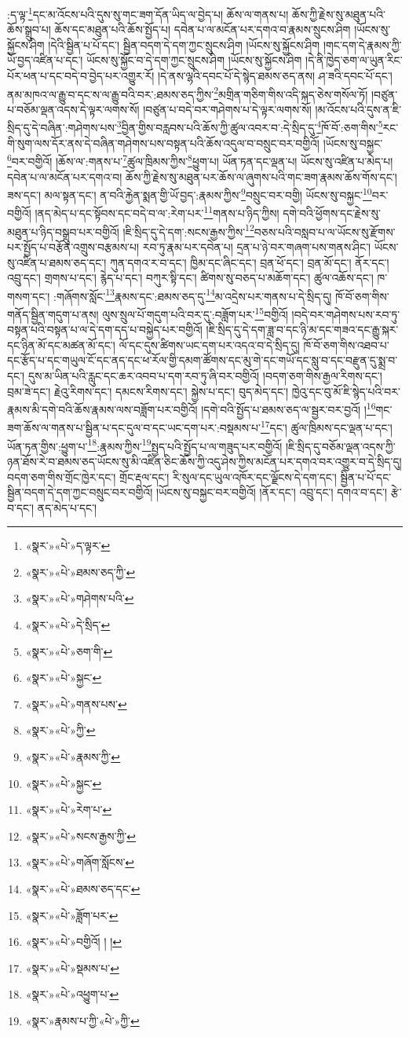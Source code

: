 :ད་ལྟ་\footnote{«སྣར་»«པེ་»ད་ལྟར་}དང་མ་འོངས་པའི་དུས་སུ་གང་ཟག་དོན་ཡིད་ལ་བྱེད་པ། ཆོས་ལ་གནས་པ། ཆོས་ཀྱི་རྗེས་སུ་མཐུན་པའི་ཆོས་སྒྲུབ་པ། ཆོས་དང་མཐུན་པའི་ཆོས་སྤྱོད་པ། དབེན་པ་ལ་མངོན་པར་དགའ་བ་རྣམས་སྲུངས་ཤིག །ཡོངས་སུ་སྐྱོངས་ཤིག །དེའི་སྦྱིན་པ་པོ་དང་། སྦྱིན་བདག་དེ་དག་ཀྱང་སྲུངས་ཤིག །ཡོངས་སུ་སྐྱོངས་ཤིག །གང་དག་དེ་རྣམས་ཀྱི་ཡོ་བྱད་འཛིན་པ་དང་། ཡོངས་སུ་སྐྱོང་བ་དེ་དག་ཀྱང་སྲུངས་ཤིག །ཡོངས་སུ་སྐྱོངས་ཤིག །དེ་ནི་ཁྱེད་ཅག་ལ་ཡུན་རིང་པོར་ཕན་པ་དང་བདེ་བ་བྱེད་པར་འགྱུར་རོ། །དེ་ནས་ལྷའི་དབང་པོ་དེ་སྙེད་ཐམས་ཅད་ནས། ཤ་ཟའི་དབང་པོ་དང་། ནམ་མཁའ་ལ་རྒྱུ་བ་དང་ས་ལ་རྒྱུ་བའི་བར་:ཐམས་ཅད་ཀྱིས་\footnote{«སྣར་»«པེ་»ཐམས་ཅད་ཀྱི་}མགྲིན་གཅིག་གིས་འདི་སྐད་ཅེས་གསོལ་ཏོ། །བཙུན་པ་བཅོམ་ལྡན་འདས་དེ་ལྟར་ལགས་སོ། །བཙུན་པ་བདེ་བར་གཤེགས་པ་དེ་ལྟར་ལགས་སོ། །མ་འོངས་པའི་དུས་ན་ཇི་སྲིད་དུ་དེ་བཞིན་:གཤེགས་པས་\footnote{«སྣར་»«པེ་»གཤེགས་པའི་}བྱིན་གྱིས་བརླབས་པའི་ཆོས་ཀྱི་ཚུལ་འབར་བ་:དེ་སྲིད་དུ་\footnote{«སྣར་»«པེ་»དེ་སྲིད་}ཁོ་བོ་:ཅག་གིས་\footnote{«སྣར་»«པེ་»ཅག་གི་}རང་གི་སུག་ལས་དོར་ནས་དེ་བཞིན་གཤེགས་པས་བསྟན་པའི་ཆོས་འདུལ་བ་བསྲུང་བར་བགྱིའོ། །ཡོངས་སུ་བསྐྱང་\footnote{«སྣར་»«པེ་»སྐྱང་}བར་བགྱིའོ། །ཆོས་ལ་:གནས་པ་\footnote{«སྣར་»«པེ་»གནས་པས་}ཚུལ་ཁྲིམས་ཀྱིས་\footnote{«སྣར་»«པེ་»ཀྱི་}ཕྱུག་པ། ཡོན་ཏན་དང་ལྡན་པ། ཡོངས་སུ་འཛིན་པ་མེད་པ། དབེན་པ་ལ་མངོན་པར་དགའ་བ། ཆོས་ཀྱི་རྗེས་སུ་མཐུན་པར་ཆོས་ལ་ཞུགས་པའི་གང་ཟག་རྣམས་ཆོས་གོས་དང་། ཟས་དང་། མལ་སྟན་དང་། ན་བའི་རྐྱེན་སྨན་གྱི་ཡོ་བྱད་:རྣམས་ཀྱིས་\footnote{«སྣར་»«པེ་»རྣམས་ཀྱི་}བསྲུང་བར་བགྱི། ཡོངས་སུ་བསྐྱང་\footnote{«སྣར་»«པེ་»སྐྱང་}བར་བགྱིའོ། །ནད་མེད་པ་དང་སྟོབས་དང་བདེ་བ་ལ་:རེག་པར་\footnote{«སྣར་»«པེ་»རེག་པ་}གནས་པ་ཉིད་ཀྱིས། དགེ་བའི་ཕྱོགས་དང་རྗེས་སུ་མཐུན་པ་ཉིད་བསྒྲུབ་པར་བགྱིའོ། །ཇི་སྲིད་དུ་དེ་དག་:སངས་རྒྱས་ཀྱིས་\footnote{«སྣར་»«པེ་»སངས་རྒྱས་ཀྱི་}བཅས་པའི་བསླབ་པ་ལ་ཡོངས་སུ་རྫོགས་པར་སྤྱོད་པ་བརྩོན་འགྲུས་བརྩམས་པ། རབ་ཏུ་རྣམ་པར་དབེན་པ། དྲན་པ་ཉེ་བར་གཞག་པས་གནས་ཤིང་། ཡོངས་སུ་འཛིན་པ་ཐམས་ཅད་དང་། ཀུན་དགའ་ར་བ་དང་། ཁྱིམ་དང་ཞིང་དང་། བྲན་ཕོ་དང་། བྲན་མོ་དང་། ནོར་དང་། འབྲུ་དང་། གྲགས་པ་དང་། རྙེད་པ་དང་། བཀུར་སྟི་དང་། ཚིགས་སུ་བཅད་པ་མཆོག་དང་། ཚུལ་འཆོས་དང་། ཁ་གསག་དང་། :གཞོགས་སློང་\footnote{«སྣར་»«པེ་»གཞོག་སློངས་}རྣམས་དང་:ཐམས་ཅད་དུ་\footnote{«སྣར་»«པེ་»ཐམས་ཅད་དང་}མ་འདྲེས་པར་གནས་པ་དེ་སྲིད་དུ། ཁོ་བོ་ཅག་གིས་གནོད་སྦྱིན་གདུག་པ་ནས། ལུས་སྲུལ་པོ་གདུག་པའི་བར་དུ་:བཟློག་པར་\footnote{«སྣར་»«པེ་»ཟློག་པར་}བགྱིའོ། །བདེ་བར་གཤེགས་པས་རབ་ཏུ་བསྟན་པའི་བསྟན་པ་ལ་དེ་དག་དད་པ་བསྐྱེད་པར་བགྱིའོ། །ཇི་སྲིད་དུ་དེ་དག་ཟླ་བ་དང་ཉི་མ་དང་གཟའ་དང་རྒྱུ་སྐར་དང་ཉིན་མོ་དང་མཚན་མོ་དང་། ལོ་དང་དུས་ཚིགས་ཡང་དག་པར་འདའ་བ་དེ་སྲིད་དུ། ཁོ་བོ་ཅག་གིས་འཐབ་པ་དང་རྩོད་པ་དང་གཡུལ་ངོ་དང་ནད་དང་ཕ་རོལ་གྱི་དམག་ཚོགས་དང་མུ་གེ་དང་གཡོ་དང་སླུ་བ་དང་བརྫུན་དུ་སྨྲ་བ་དང་། དུས་མ་ཡིན་པའི་རླུང་དང་ཆར་འབབ་པ་དག་རབ་ཏུ་ཞི་བར་བགྱིའོ། །བདག་ཅག་གིས་རྒྱལ་རིགས་དང་། བྲམ་ཟེ་དང་། རྗེའུ་རིགས་དང་། དམངས་རིགས་དང་། སྐྱེས་པ་དང་། བུད་མེད་དང་། ཁྱེའུ་དང་བུ་མོ་ཇི་སྙེད་པའི་བར་རྣམས་མི་དགེ་བའི་ཆོས་རྣམས་ལས་བཟློག་པར་བགྱིའོ། །དགེ་བའི་སྤྱོད་པ་ཐམས་ཅད་ལ་སྦྱར་བར་བྱའོ། །\footnote{«སྣར་»«པེ་»བགྱིའོ། ། །}གང་ཟག་ཆོས་ལ་གནས་པ་སྦྱིན་པ་དང་དུལ་བ་དང་ཡང་དག་པར་:བསྡམས་པ་\footnote{«སྣར་»«པེ་»སྡམས་པ་}དང་། ཚུལ་ཁྲིམས་དང་ལྡན་པ་དང་། ཡོན་ཏན་གྱིས་:ཕྱུག་པ་\footnote{«སྣར་»«པེ་»འཕྱུག་པ་}:རྣམས་ཀྱིས་\footnote{«སྣར་»རྣམས་པ་ཀྱི་«པེ་»ཀྱི་}སྤྱད་པའི་སྤྱོད་པ་ལ་གཟུད་པར་བགྱིའོ། །ཇི་སྲིད་དུ་བཅོམ་ལྡན་འདས་ཀྱི་ཉན་ཐོས་རེ་བ་ཐམས་ཅད་ཡོངས་སུ་མི་འཛིན་ཅིང་ཆོས་ཀྱི་འདུ་ཤེས་ཀྱིས་མངོན་པར་དགའ་བར་འགྱུར་བ་དེ་སྲིད་དུ། བདག་ཅག་གིས་གྲོང་ཁྱེར་དང་། གྲོང་རྡལ་དང་། རི་སུལ་དང་ཡུལ་འཁོར་དང་ལྗོངས་དེ་དག་དང་། སྦྱིན་པ་པོ་དང་སྦྱིན་བདག་དེ་དག་ཀྱང་བསྲུང་བར་བགྱིའོ། །ཡོངས་སུ་བསྐྱང་བར་བགྱིའོ། །ནོར་དང་། འབྲུ་དང་། དགའ་བ་དང་། རྩེ་བ་དང་། ནད་མེད་པ་དང་། 